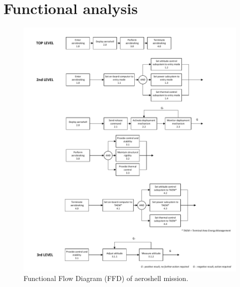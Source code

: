 \section{Functional analysis}\label{ch:func}

\begin{figure}[H]
\centering
\includegraphics[width = 1.2\textwidth]{Figure/FFD.pdf}
\caption{Functional Flow Diagram (FFD) of aeroshell mission.}
\label{fig:ffd}
\end{figure}